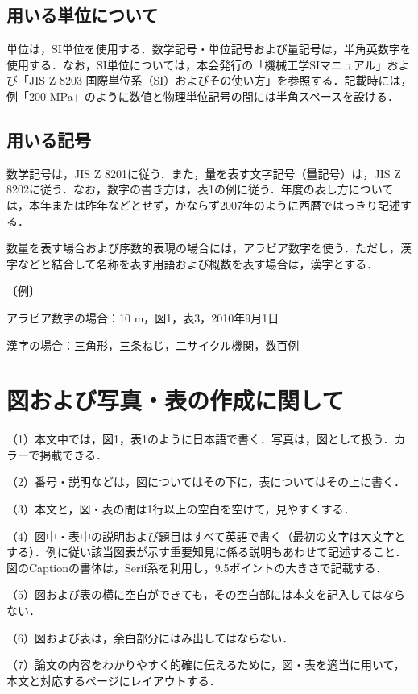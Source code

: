 \documentclass[a4jsme, fleqn, dvipdfmx]{jsmepaper}
\begin{document}
\subsection{用いる単位について}

単位は，SI単位を使用する．数学記号・単位記号および量記号は，半角英数字を使用する．なお，SI単位については，本会発行の「機械工学SIマニュアル」および「JIS Z 8203 国際単位系（SI）およびその使い方」を参照する．記載時には，例「200 MPa」のように数値と物理単位記号の間には半角スペースを設ける．

\subsection{用いる記号}

数学記号は，JIS Z 8201に従う．また，量を表す文字記号（量記号）は，JIS Z 8202に従う．なお，数字の書き方は，表1の例に従う．年度の表し方については，本年または昨年などとせず，かならず2007年のように西暦ではっきり記述する．

数量を表す場合および序数的表現の場合には，アラビア数字を使う．ただし，漢字などと結合して名称を表す用語および概数を表す場合は，漢字とする．

〔例〕

アラビア数字の場合：10 m，図1，表3，2010年9月1日

漢字の場合：三角形，三条ねじ，二サイクル機関，数百例

\section{図および写真・表の作成に関して}

（1）本文中では，図1，表1のように日本語で書く．写真は，図として扱う．カラーで掲載できる．

（2）番号・説明などは，図についてはその下に，表についてはその上に書く．

（3）本文と，図・表の間は1行以上の空白を空けて，見やすくする．

（4）図中・表中の説明および題目はすべて英語で書く（最初の文字は大文字とする）．例に従い該当図表が示す重要知見に係る説明もあわせて記述すること．図のCaptionの書体は，Serif系を利用し，9.5ポイントの大きさで記載する．

（5）図および表の横に空白ができても，その空白部には本文を記入してはならない．

（6）図および表は，余白部分にはみ出してはならない．

（7）論文の内容をわかりやすく的確に伝えるために，図・表を適当に用いて，本文と対応するページにレイアウトする．
\end{document}
